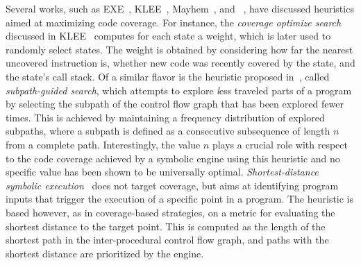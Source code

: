 Several works, such as {\textsc EXE}~\cite{EXE-CCS06}, {\textsc KLEE}~\cite{KLEE-OSDI08}, {\textsc Mayhem}~\cite{MAYHEM-SP12}, and {\textsc \stwoe}~\cite{CKC-TOCS12}, have discussed heuristics aimed at maximizing code coverage. For instance, the {\em coverage optimize search} discussed in {\textsc KLEE}~\cite{KLEE-OSDI08} computes for each state a weight, which is later used to randomly select states. The weight is obtained by considering how far the nearest uncovered instruction is, whether new code was recently covered by the state, and the state's call stack. Of a similar flavor is the heuristic proposed in~\cite{LZL-OOPSLA13}, called {\em subpath-guided search}, which attempts to explore {\textit less traveled} parts of a program by selecting the subpath of the control flow graph that has been explored fewer times. This is achieved by maintaining a frequency distribution of explored subpaths, where a subpath is defined as a consecutive subsequence of length $n$ from a complete path. Interestingly, the value $n$ plays a crucial role with respect to the code coverage achieved by a symbolic engine using this heuristic and no specific value has been shown to be universally optimal. %
{\em Shortest-distance symbolic execution}~\cite{MPF-SAS11} does not target coverage, but aims at identifying program inputs that trigger the execution of a specific point in a program. The heuristic is based however, as in coverage-based strategies, on a metric for evaluating the shortest distance to the target point. This is computed as the length of the shortest path in the inter-procedural control flow graph, and paths with the shortest distance are prioritized by the engine. 


